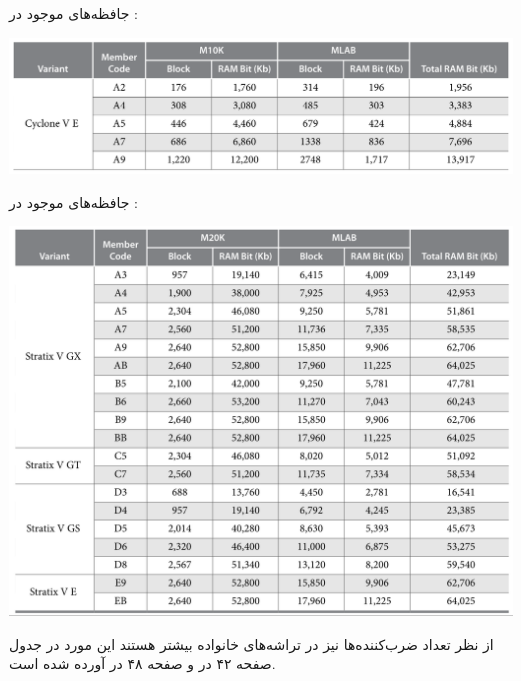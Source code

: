 \begin{qsolve}
	جافظه‌های موجود در :
	\begin{center}
		\includegraphics*[width=0.8\linewidth]{pics/img6.png}
		\label{حافظه‌های Cyclone}
	\end{center}
	
	
	جافظه‌های موجود در :
	\begin{center}
		\includegraphics*[width=0.8\linewidth]{pics/img5.png}
		\label{حافظه‌های Stratix}
	\end{center}
	
	
		از نظر تعداد ضرب‌کننده‌ها نیز در تراشه‌های خانواده  بیشتر هستند این مورد در جدول صفحه ۴۲ در \cite{ref1} و صفحه ۴۸ در \cite{ref2} آورده شده است.
\end{qsolve}



